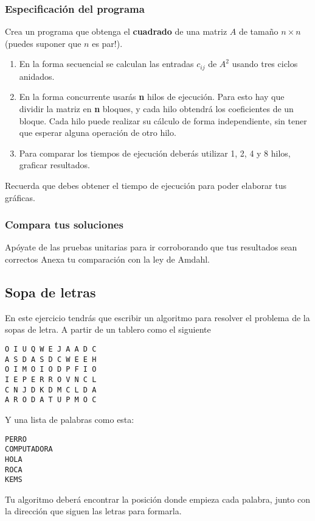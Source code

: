 \documentclass[a4paper,11pt]{article}
\begin{document}
	\subsubsection*{Especificación del programa}
	Crea un programa que obtenga el \textbf{cuadrado} de una matriz $ A $ de tamaño $ n \times n $ (puedes suponer que $ n $ es par!).
	\begin{enumerate}
		\item En la forma secuencial se calculan las entradas $ c_{ij} $ de $ A^2 $ usando tres ciclos anidados.
		\item En la forma concurrente usarás \textbf{n} hilos de ejecución. Para esto hay que dividir la matriz en \textbf{n} bloques, y cada hilo obtendrá los coeficientes de un bloque. Cada hilo puede realizar su cálculo de forma independiente, sin tener que esperar alguna operación de otro hilo.

		\item Para comparar los tiempos de ejecución deberás utilizar 1, 2, 4 y 8 hilos, graficar resultados.
	\end{enumerate}


	Recuerda que debes obtener el tiempo de ejecución para poder elaborar tus gráficas.

	\subsubsection*{Compara tus soluciones}
	Apóyate de las pruebas unitarias para ir corroborando que tus resultados sean correctos
	Anexa tu comparación con la ley de Amdahl.

	\subsection{Sopa de letras}
	En este ejercicio tendrás que escribir un algoritmo para resolver el problema de la sopas de letra. A partir de un tablero como el siguiente

	\begin{verbatim}
O I U Q W E J A A D C
A S D A S D C W E E H
O I M O I O D P F I O
I E P E R R O V N C L
C N J D K D M C L D A
A R O D A T U P M O C
	\end{verbatim}

	Y una lista de palabras como esta:

	\begin{verbatim}
PERRO
COMPUTADORA
HOLA
ROCA
KEMS
	\end{verbatim}

	Tu algoritmo deberá encontrar la posición donde empieza cada palabra, junto con la dirección que siguen las letras para formarla.
\end{document}
